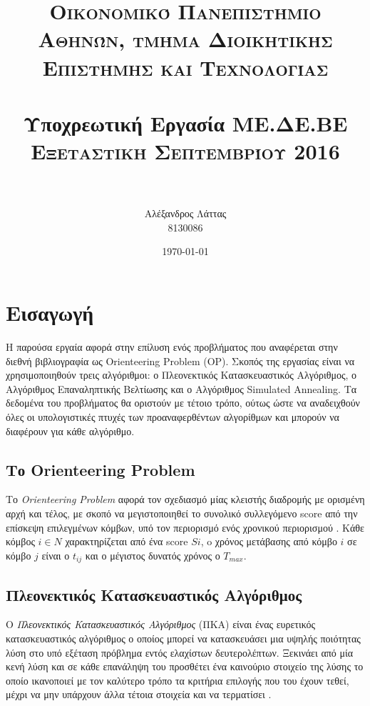 \documentclass[12pt, a4paper]{article}
\title{	
\normalfont \normalsize 
\textsc{Οικονομικό Πανεπιστήμιο Αθηνών, τμήμα Διοικητικής Επιστήμης και Τεχνολογίας} \\ [25pt] %
\horrule{0.5pt} \\[0.4cm] %
\huge Υποχρεωτική Εργασία ΜΕ.ΔΕ.ΒΕ \\ %
\textsc{Εξεταστική Σεπτεμβρίου 2016} \\ 
\horrule{2pt} \\[0.5cm] %
}
\author{Αλέξανδρος Λάττας \\ 8130086} %
\date{\normalsize\today} %
\begin{document}
\maketitle %


\section{Εισαγωγή}

Η παρούσα εργαία αφορά στην επίλυση ενός προβλήματος που αναφέρεται στην διεθνή βιβλιογραφία ως Orienteering Problem (OP). Σκοπός της εργασίας είναι να χρησιμοποιηθούν τρεις αλγόριθμοι: ο Πλεονεκτικός Κατασκευαστικός Αλγόριθμος, ο Αλγόριθμος Επαναληπτικής Βελτίωσης και ο Αλγόριθμος Simulated Annealing. Τα δεδομένα του προβλήματος θα οριστούν με τέτοιο τρόπο, ούτως ώστε να αναδειχθούν όλες οι υπολογιστικές πτυχές των προαναφερθέντων αλγορίθμων και μπορούν να διαφέρουν για κάθε αλγόριθμο.

\subsection{Το Orienteering Problem}
Το \textit{Orienteering Problem} αφορά τον σχεδιασμό μίας κλειστής διαδρομής με ορισμένη αρχή και τέλος, με σκοπό να μεγιστοποιηθεί το συνολικό συλλεγόμενο score από την επίσκεψη επιλεγμένων κόμβων, υπό τον περιορισμό ενός χρονικού περιορισμού \cite{feillet2005traveling}. Κάθε κόμβος \(i \in N\) χαρακτηρίζεται από ένα score \( Si \), o χρόνος μετάβασης από κόμβο \(i\) σε κόμβο \(j\) είναι ο \(t_{ij}\) και ο μέγιστος δυνατός χρόνος ο \(T_{max}\).

\subsection{Πλεονεκτικός Κατασκευαστικός Αλγόριθμος}
Ο \textit{Πλεονεκτικός Κατασκευαστικός Αλγόριθμος} (ΠΚΑ) είναι ένας ευρετικός κατασκευαστικός αλγόριθμος ο οποίος μπορεί να κατασκευάσει μια υψηλής ποιότητας λύση στο υπό εξέταση πρόβλημα εντός ελαχίστων δευτερολέπτων. Ξεκινάει από μία κενή λύση και σε κάθε επανάληψη του προσθέτει ένα καινούριο στοιχείο της λύσης το οποίο ικανοποιεί με τον καλύτερο τρόπο τα κριτήρια επιλογής που του έχουν τεθεί, μέχρι να μην υπάρχουν άλλα τέτοια στοιχεία και να τερματίσει \cite{Lecture2}.
\end{document}

